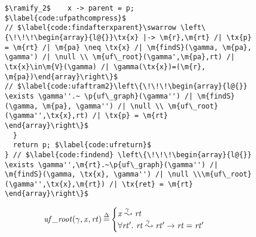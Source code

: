 \begin{figure}[t]
\begin{lstlisting}
$\ramify_2$    x -> parent = p; $\label{code:ufpathcompress}$
// $\label{code:findafterxparent}\swarrow \left\{\!\!\!\begin{array}{l@{}}\tx{x} |-> \m{r},\m{rt} /| \tx{p} = \m{rt} /| \m{pa} \neq \tx{x} /| \m{findS}(\gamma, \m{pa}, \gamma') /| \null \\ \m{uf\_root}(\gamma',\m{pa},rt) /| \tx{x}\in\m{V}(\gamma) /| \gamma(\tx{x})=(\m{r}, \m{pa})\end{array}\right\}$
// $\label{code:ufaftram2}\left\{\!\!\!\begin{array}{l@{}} \exists \gamma''.~ \p{uf\_graph}(\gamma'') /| \m{findS}(\gamma, \m{pa}, \gamma'') /| \null \\ \m{uf\_root}(\gamma'',\tx{x},rt) /| \tx{p} = \m{rt} \end{array}\right\}$
  }
  return p; $\label{code:ufreturn}$
} // $\label{code:findend} \left\{\!\!\!\begin{array}{l@{}} \exists \gamma'',\m{rt}.~\p{uf\_graph}(\gamma'') /| \m{findS}(\gamma, \tx{x}, \gamma'') /| \null \\\m{uf\_root}(\gamma'',\tx{x},\m{rt}) /| \tx{ret} = \m{rt}  \end{array}\right\}$
\end{lstlisting}

\begin{equation*}
\begin{array}{l@{\hspace{2pt}}c@{\hspace{2pt}}l}
\m{uf\_root}(\gamma,\m{x},\m{rt}) & \defeq & \begin{cases}
\m{x} \mathrel{{\stackrel{\gamma~}{\leadsto}}} \m{rt} \\
\forall \m{rt'}.~\m{rt} \mathrel{{\stackrel{\gamma~}{\leadsto}}} \m{rt'} -> \m{rt} = \m{rt'}
\end{cases} \\
\end{array}
\end{equation*}


\end{figure}
